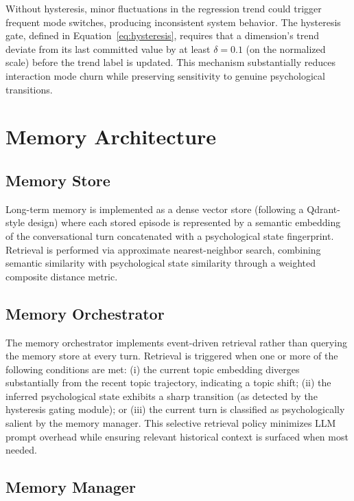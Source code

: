 \documentclass[conference]{IEEEtran}
\begin{document}
Without hysteresis, minor fluctuations in the regression trend could trigger frequent mode switches, producing inconsistent system behavior. The hysteresis gate, defined in Equation~\eqref{eq:hysteresis}, requires that a dimension's trend deviate from its last committed value by at least $\delta = 0.1$ (on the normalized scale) before the trend label is updated. This mechanism substantially reduces interaction mode churn while preserving sensitivity to genuine psychological transitions.

\section{Memory Architecture}
\label{sec:memory}

\subsection{Memory Store}

Long-term memory is implemented as a dense vector store (following a Qdrant-style design) where each stored episode is represented by a semantic embedding of the conversational turn concatenated with a psychological state fingerprint. Retrieval is performed via approximate nearest-neighbor search, combining semantic similarity with psychological state similarity through a weighted composite distance metric.

\subsection{Memory Orchestrator}

The memory orchestrator implements event-driven retrieval rather than querying the memory store at every turn. Retrieval is triggered when one or more of the following conditions are met: (i) the current topic embedding diverges substantially from the recent topic trajectory, indicating a topic shift; (ii) the inferred psychological state exhibits a sharp transition (as detected by the hysteresis gating module); or (iii) the current turn is classified as psychologically salient by the memory manager. This selective retrieval policy minimizes LLM prompt overhead while ensuring relevant historical context is surfaced when most needed.

\subsection{Memory Manager}
\end{document}
